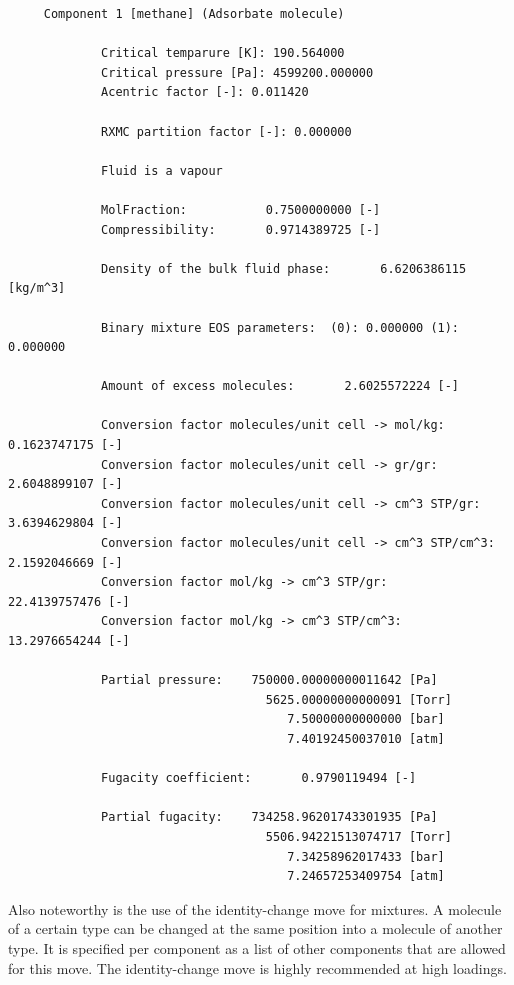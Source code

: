 \begin{tiny}
\begin{verbatim}
     Component 1 [methane] (Adsorbate molecule)
     
             Critical temparure [K]: 190.564000
             Critical pressure [Pa]: 4599200.000000
             Acentric factor [-]: 0.011420
     
             RXMC partition factor [-]: 0.000000
     
             Fluid is a vapour
     
             MolFraction:           0.7500000000 [-]
             Compressibility:       0.9714389725 [-]
     
             Density of the bulk fluid phase:       6.6206386115 [kg/m^3]
     
             Binary mixture EOS parameters:  (0): 0.000000 (1): 0.000000
     
             Amount of excess molecules:       2.6025572224 [-]
     
             Conversion factor molecules/unit cell -> mol/kg:       0.1623747175 [-]
             Conversion factor molecules/unit cell -> gr/gr:       2.6048899107 [-]
             Conversion factor molecules/unit cell -> cm^3 STP/gr:       3.6394629804 [-]
             Conversion factor molecules/unit cell -> cm^3 STP/cm^3:       2.1592046669 [-]
             Conversion factor mol/kg -> cm^3 STP/gr:      22.4139757476 [-]
             Conversion factor mol/kg -> cm^3 STP/cm^3:      13.2976654244 [-]
     
             Partial pressure:    750000.00000000011642 [Pa]
                                    5625.00000000000091 [Torr]
                                       7.50000000000000 [bar]
                                       7.40192450037010 [atm]
     
             Fugacity coefficient:       0.9790119494 [-]
     
             Partial fugacity:    734258.96201743301935 [Pa]
                                    5506.94221513074717 [Torr]
                                       7.34258962017433 [bar]
                                       7.24657253409754 [atm]
\end{verbatim}
\end{tiny}
Also noteworthy is the use of the identity-change move for mixtures. A molecule of a certain type can be changed at the same position into a molecule of
another type. It is specified per component as a list of other components that are allowed for this move. The identity-change move is highly recommended
at high loadings.

